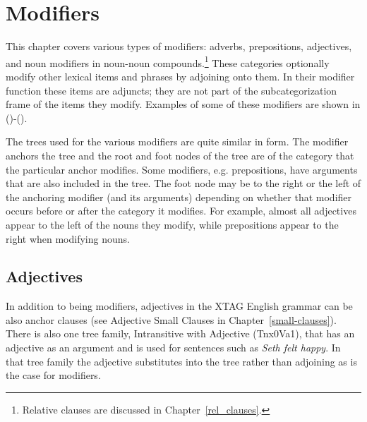 \chapter{Modifiers}
\label{modifiers}

This chapter covers various types of modifiers: adverbs, prepositions,
adjectives, and noun modifiers in noun-noun compounds.\footnote{Relative
clauses are discussed in Chapter~\ref{rel_clauses}.}  These categories
optionally modify other lexical items and phrases by adjoining onto them.  In
their modifier function these items are adjuncts; they are not part of the
subcategorization frame of the items they modify.  Examples of some of these
modifiers are shown in ()-().




The trees used for the various modifiers are quite similar in form.  The
modifier anchors the tree and the root and foot nodes of the tree are of the
category that the particular anchor modifies. Some modifiers,
e.g. prepositions, have arguments that are also included in the tree.  The foot
node may be to the right or the left of the anchoring modifier (and its
arguments) depending on whether that modifier occurs before or after the
category it modifies. For example, almost all adjectives appear to the left of
the nouns they modify, while prepositions appear to the right when modifying
nouns.


\section{Adjectives}
\label{adj-modifier}

In addition to being modifiers, adjectives in the XTAG English grammar can be
also anchor clauses (see Adjective Small Clauses in
Chapter~\ref{small-clauses}).  There is also one tree family, Intransitive with
Adjective (Tnx0Va1), that has an adjective as an argument and is used for
sentences such as {\it Seth felt happy}. In that tree family the adjective
substitutes into the tree rather than adjoining as is the case for modifiers.


